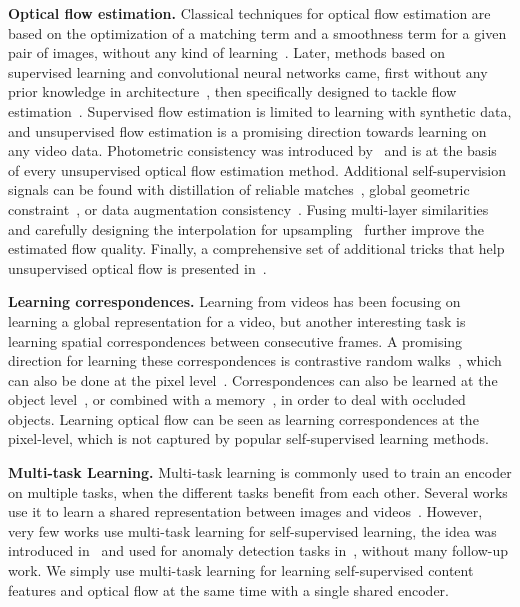 \documentclass{article} %
\newcommand{\parspace}{\vspace{0mm}}
\begin{document}
\noindent \textbf{Optical flow estimation.} Classical techniques for optical flow estimation are based on the optimization of a matching term and a smoothness term for a given pair of images, without any kind of learning~\citep{horn1981flow, brox2004warping, sun2010secrets}. Later, methods based on supervised learning and convolutional neural networks came, first without any prior knowledge in architecture~\citep{yu2016flownet, ilg2017flownet2}, then specifically designed to tackle flow estimation~\citep{ranjan2017spynet, sun2018pwcnet, yang2019vcn, teed2020raft}. Supervised flow estimation is limited to learning with synthetic data, and unsupervised flow estimation is a promising direction towards learning on any video data. Photometric consistency was introduced by~\citep{ren2017dstflow} and is at the basis of every unsupervised optical flow estimation method. Additional self-supervision signals can be found with distillation of reliable matches~\citep{liu2019selflow, lui2019ddflow}, global geometric constraint~\citep{zhong2019epiflow}, or data augmentation consistency~\citep{liu2020arflow, stone2021smurf}. Fusing multi-layer similarities~\citep{im2020unsupsimflow} and carefully designing the interpolation for upsampling~\citep{luo2021upflow} further improve the estimated flow quality. Finally, a comprehensive set of additional tricks that help unsupervised optical flow is presented in~\citep{jonschkowski2020uflow}.
\parspace

\noindent \textbf{Learning correspondences.} Learning from videos has been focusing on learning a global representation for a video, but another interesting task is learning spatial correspondences between consecutive frames. A promising direction for learning these correspondences is contrastive random walks~\citep{jabri2020crw}, which can also be done at the pixel level~\citep{bian2022mcrw}. Correspondences can also be learned at the object level~\citep{xu2021vfs, mandala2021mformer}, or combined with a memory~\citep{tokmakov2022ram}, in order to deal with occluded objects. Learning optical flow can be seen as learning correspondences at the pixel-level, which is not captured by popular self-supervised learning methods.
\parspace

\noindent \textbf{Multi-task Learning.} Multi-task learning is commonly used to train an encoder on multiple tasks, when the different tasks benefit from each other. Several works use it to learn a shared representation between images and videos~\citep{zhang2021cover, girdhar2022omnimae}. However, very few works use multi-task learning for self-supervised learning, the idea was introduced in~\citep{doersch2017multitaskssl} and used for anomaly detection tasks in~\citep{georgescu2021anomaly}, without many follow-up work. We simply use multi-task learning for learning self-supervised content features and optical flow at the same time with a single shared encoder.
\end{document}
